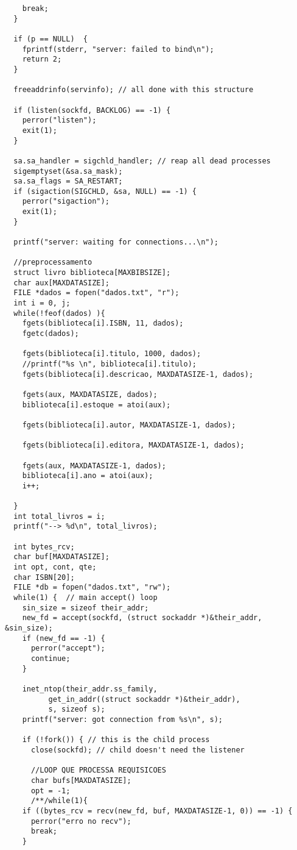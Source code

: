 \documentclass[11pt, brazil]{article} %
\begin{document}
\begin{verbatim}
    break;
  }

  if (p == NULL)  {
    fprintf(stderr, "server: failed to bind\n");
    return 2;
  }

  freeaddrinfo(servinfo); // all done with this structure

  if (listen(sockfd, BACKLOG) == -1) {
    perror("listen");
    exit(1);
  }

  sa.sa_handler = sigchld_handler; // reap all dead processes
  sigemptyset(&sa.sa_mask);
  sa.sa_flags = SA_RESTART;
  if (sigaction(SIGCHLD, &sa, NULL) == -1) {
    perror("sigaction");
    exit(1);
  }

  printf("server: waiting for connections...\n");

  //preprocessamento
  struct livro biblioteca[MAXBIBSIZE];
  char aux[MAXDATASIZE];
  FILE *dados = fopen("dados.txt", "r");
  int i = 0, j;
  while(!feof(dados) ){
    fgets(biblioteca[i].ISBN, 11, dados);
    fgetc(dados);
		
    fgets(biblioteca[i].titulo, 1000, dados);
    //printf("%s \n", biblioteca[i].titulo);
    fgets(biblioteca[i].descricao, MAXDATASIZE-1, dados);
		
    fgets(aux, MAXDATASIZE, dados);
    biblioteca[i].estoque = atoi(aux);
		
    fgets(biblioteca[i].autor, MAXDATASIZE-1, dados);
		
    fgets(biblioteca[i].editora, MAXDATASIZE-1, dados);
		
    fgets(aux, MAXDATASIZE-1, dados);
    biblioteca[i].ano = atoi(aux);
    i++;
		
  }
  int total_livros = i;
  printf("--> %d\n", total_livros);
	
  int bytes_rcv;
  char buf[MAXDATASIZE];
  int opt, cont, qte;
  char ISBN[20];
  FILE *db = fopen("dados.txt", "rw");
  while(1) {  // main accept() loop
    sin_size = sizeof their_addr;
    new_fd = accept(sockfd, (struct sockaddr *)&their_addr, &sin_size);
    if (new_fd == -1) {
      perror("accept");
      continue;
    }

    inet_ntop(their_addr.ss_family,
	      get_in_addr((struct sockaddr *)&their_addr),
	      s, sizeof s);
    printf("server: got connection from %s\n", s);

    if (!fork()) { // this is the child process
      close(sockfd); // child doesn't need the listener
			
      //LOOP QUE PROCESSA REQUISICOES
      char bufs[MAXDATASIZE];
      opt = -1;	
      /**/while(1){		
	if ((bytes_rcv = recv(new_fd, buf, MAXDATASIZE-1, 0)) == -1) {
	  perror("erro no recv");
	  break;
	}


\end{verbatim}
\end{document}
